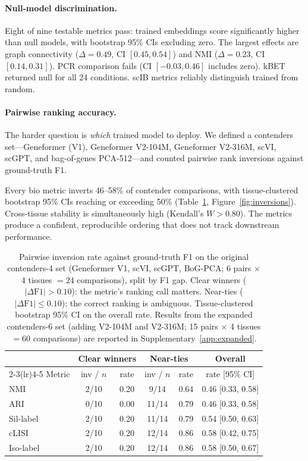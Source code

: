 \documentclass[11pt]{article}
\begin{document}
\paragraph{Null-model discrimination.} Eight of nine testable metrics pass: trained embeddings score significantly higher than null models, with bootstrap 95\% CIs excluding zero. The largest effects are graph connectivity ($\Delta = 0.49$, CI $[0.45, 0.54]$) and NMI ($\Delta = 0.23$, CI $[0.14, 0.31]$). PCR comparison fails (CI $[-0.03, 0.46]$ includes zero). kBET returned null for all 24 conditions. scIB metrics reliably distinguish trained from random.

\paragraph{Pairwise ranking accuracy.} The harder question is \emph{which} trained model to deploy. We defined a contenders set---Geneformer (V1), Geneformer V2-104M, Geneformer V2-316M, scVI, scGPT, and bag-of-genes PCA-512---and counted pairwise rank inversions against ground-truth F1.

Every bio metric inverts 46--58\% of contender comparisons, with tissue-clustered bootstrap 95\% CIs reaching or exceeding 50\% (Table~\ref{tab:scib_inversions}, Figure~\ref{fig:inversions}). Cross-tissue stability is simultaneously high (Kendall's $W > 0.80$). The metrics produce a confident, reproducible ordering that does not track downstream performance.

\begin{table}[t]
\centering
\caption{Pairwise inversion rate against ground-truth F1 on the original contenders-4 set (Geneformer V1, scVI, scGPT, BoG-PCA; 6 pairs $\times$ 4 tissues $= 24$ comparisons), split by F1 gap. Clear winners ($|\Delta\text{F1}| > 0.10$): the metric's ranking call matters. Near-ties ($|\Delta\text{F1}| \leq 0.10$): the correct ranking is ambiguous. Tissue-clustered bootstrap 95\% CI on the overall rate. Results from the expanded contenders-6 set (adding V2-104M and V2-316M; 15 pairs $\times$ 4 tissues $= 60$ comparisons) are reported in Supplementary~\ref{app:expanded}.}
\label{tab:scib_inversions}
\small
\begin{tabular}{@{}lccccc@{}}
\toprule
 & \multicolumn{2}{c}{Clear winners} & \multicolumn{2}{c}{Near-ties} & Overall \\
\cmidrule(lr){2-3}\cmidrule(lr){4-5}
Metric & inv / $n$ & rate & inv / $n$ & rate & rate [95\% CI] \\
\midrule
NMI       & 2/10 & 0.20 & 9/14  & 0.64 & 0.46 [0.33, 0.58] \\
ARI       & 0/10 & 0.00 & 11/14 & 0.79 & 0.46 [0.33, 0.58] \\
Sil-label & 2/10 & 0.20 & 11/14 & 0.79 & 0.54 [0.50, 0.63] \\
cLISI     & 2/10 & 0.20 & 12/14 & 0.86 & 0.58 [0.42, 0.75] \\
Iso-label & 2/10 & 0.20 & 12/14 & 0.86 & 0.58 [0.50, 0.67] \\
\bottomrule
\end{tabular}
\end{table}
\end{document}
